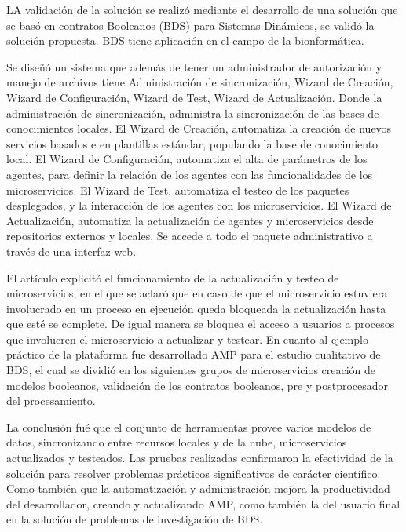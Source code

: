 LA validación de la solución se realizó mediante el desarrollo de una solución que se basó en contratos Booleanos (BDS) para Sistemas Dinámicos,
se validó la solución propuesta.
BDS tiene aplicación en el campo de la bionformática.\par

Se diseñó un sistema que además de tener un administrador de autorización y manejo de archivos tiene
Administración de sincronización, Wizard de Creación, Wizard de Configuración, Wizard de Test, Wizard de Actualización. Donde la administración de sincronización, administra la sincronización de las bases de conocimientos locales. El Wizard de Creación, automatiza la creación de nuevos servicios basados e en plantillas estándar,
populando la base de conocimiento local. El Wizard de Configuración, automatiza el alta de parámetros de los agentes,
para definir la relación de los agentes con las funcionalidades de los microservicios. El Wizard de Test, automatiza el testeo de los paquetes desplegados, y la interacción de los agentes con los microservicios. El Wizard de Actualización, automatiza la actualización de agentes y microservicios desde repositorios externos y locales.
Se accede a todo el paquete administrativo a través de una interfaz web.\par

El artículo explicitó el funcionamiento de la actualización y testeo de microservicios,
en el que se aclaró que en caso de que el microservicio estuviera involucrado
en un proceso en ejecución queda bloqueada la actualización hasta que esté se complete.
De igual manera se bloquea el acceso a usuarios a procesos que involucren el microservicio a actualizar y testear.
En cuanto al ejemplo práctico de la plataforma fue desarrollado AMP para el estudio cualitativo de BDS,
el cual se dividió en los siguientes grupos de microservicios creación de modelos booleanos, validación de los contratos booleanos, pre y postprocesador del procesamiento.\par

La conclusión fué que el conjunto de herramientas provee varios modelos de datos,
sincronizando entre recursos locales y de la nube, microservicios actualizados y testeados.
Las pruebas realizadas confirmaron la efectividad de la solución para resolver
problemas prácticos significativos de carácter científico. Como también que la automatización y administración
mejora la productividad del desarrollador, creando y actualizando AMP, como también la del usuario final en la
solución de problemas de investigación de BDS.\par
